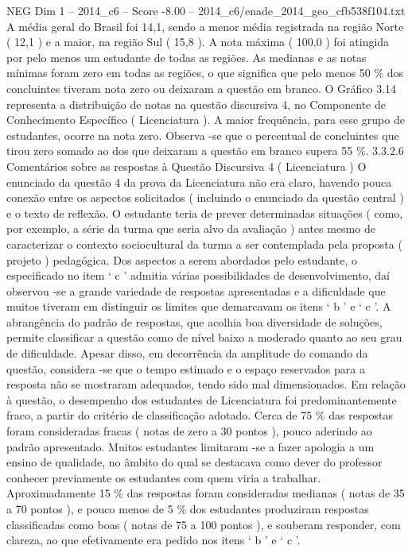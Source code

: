\begin{textsample}{NEG Dim 1 – 2014\_c6 – Score -8.00 – 2014\_c6/enade\_2014\_geo\_cfb538f104.txt}
A média geral do Brasil foi 14,1, sendo a menor média registrada na região Norte ( 12,1 ) e a maior, na região Sul ( 15,8 ).
A nota máxima ( 100,0 ) foi atingida por pelo menos um estudante de todas as regiões.
As medianas e as notas mínimas foram zero em todas as regiões, o que significa que pelo menos 50 \% dos concluintes tiveram nota zero ou deixaram a questão em branco.
O Gráfico 3.14 representa a distribuição de notas na questão discursiva 4, no Componente de Conhecimento Específico ( Licenciatura ).
A maior frequência, para esse grupo de estudantes, ocorre na nota zero.
Observa -se que o percentual de concluintes que tirou zero somado ao dos que deixaram a questão em branco supera 55 \%. 3.3.2.6 Comentários sobre as respostas à Questão Discursiva 4 ( Licenciatura ) O enunciado da questão 4 da prova da Licenciatura não era claro, havendo pouca conexão entre os aspectos solicitados ( incluindo o enunciado da questão central ) e o texto de reflexão.
O estudante teria de prever determinadas situações ( como, por exemplo, a série da turma que seria alvo da avaliação ) antes mesmo de caracterizar o contexto sociocultural da turma a ser contemplada pela proposta ( projeto ) pedagógica.
Dos aspectos a serem abordados pelo estudante, o especificado no item ‘ c ’ admitia várias possibilidades de desenvolvimento, daí observou -se a grande variedade de respostas apresentadas e a dificuldade que muitos tiveram em distinguir os limites que demarcavam os itens ‘ b ’ e ‘ c ’.
A abrangência do padrão de respostas, que acolhia boa diversidade de soluções, permite classificar a questão como de nível baixo a moderado quanto ao seu grau de dificuldade.
Apesar disso, em decorrência da amplitude do comando da questão, considera -se que o tempo estimado e o espaço reservados para a resposta não se mostraram adequados, tendo sido mal dimensionados.
Em relação à questão, o desempenho dos estudantes de Licenciatura foi predominantemente fraco, a partir do critério de classificação adotado.
Cerca de 75 \% das respostas foram consideradas fracas ( notas de zero a 30 pontos ), pouco aderindo ao padrão apresentado.
Muitos estudantes limitaram -se a fazer apologia a um ensino de qualidade, no âmbito do qual se destacava como dever do professor conhecer previamente os estudantes com quem viria a trabalhar.
Aproximadamente 15 \% das respostas foram consideradas medianas ( notas de 35 a 70 pontos ), e pouco menos de 5 \% dos estudantes produziram respostas classificadas como boas ( notas de 75 a 100 pontos ), e souberam responder, com clareza, ao que efetivamente era pedido nos itens ‘ b ’ e ‘ c ’.

\end{textsample}
